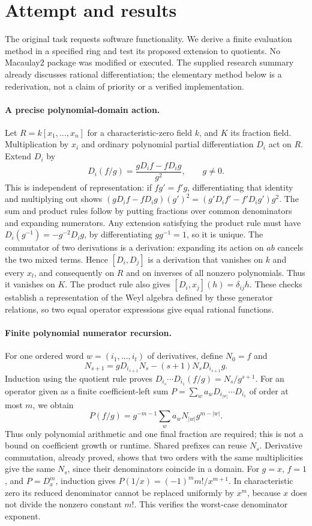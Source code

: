 \documentclass[11pt]{article}
\begin{document}
\section{Attempt and results}
The original task requests software functionality. We derive a finite evaluation
method in a specified ring and test its proposed extension to quotients. No
Macaulay2 package was modified or executed. The supplied research summary
already discusses rational differentiation; the elementary method below is a
rederivation, not a claim of priority or a verified implementation.

\paragraph{A precise polynomial-domain action.}
Let $R=k[x_1,\ldots,x_n]$ for a characteristic-zero field $k$, and $K$ its
fraction field. Multiplication by $x_i$ and ordinary polynomial partial
 differentiation $D_i$ act on $R$. Extend $D_i$ by
\[
D_i(f/g)=\frac{gD_if-fD_ig}{g^2},\qquad g\ne0.
\]
This is independent of representation: if $fg'=f'g$, differentiating that
identity and multiplying out shows
$(gD_if-fD_ig)(g')^2=(g'D_if'-f'D_ig')g^2$.
The sum and product rules follow by putting fractions over common denominators
and expanding numerators. Any extension satisfying the product rule must have
$D_i(g^{-1})=-g^{-2}D_ig$, by differentiating $gg^{-1}=1$, so it is unique.
The commutator of two derivations is a derivation: expanding its action on $ab$
cancels the two mixed terms. Hence $[D_i,D_j]$ is a derivation that vanishes on
$k$ and every $x_l$, and consequently on $R$ and on inverses of all nonzero
polynomials. Thus it vanishes on $K$. The product rule also gives
$[D_i,x_j](h)=\delta_{ij}h$. These checks establish a representation of the
Weyl algebra defined by these generator relations, so two equal operator
expressions give equal rational functions.

\paragraph{Finite polynomial numerator recursion.}
For one ordered word $w=(i_1,\ldots,i_t)$ of derivatives, define $N_0=f$ and
\[
N_{s+1}=gD_{i_{s+1}}N_s-(s+1)N_sD_{i_{s+1}}g.
\]
Induction using the quotient rule proves
$D_{i_s}\cdots D_{i_1}(f/g)=N_s/g^{s+1}$.
For an operator given as a finite coefficient-left sum
$P=\sum_w a_w D_{i_{|w|}}\cdots D_{i_1}$ of order at most $m$, we obtain
\[
P(f/g)=g^{-m-1}\sum_w a_w N_{|w|}g^{m-|w|}.
\]
Thus only polynomial arithmetic and one final fraction are required; this is
not a bound on coefficient growth or runtime. Shared prefixes can reuse $N_s$.
Derivative commutation, already proved, shows that two orders with the same
multiplicities give the same $N_s$, since their denominators coincide in a
domain. For $g=x$, $f=1$, and $P=D_x^m$, induction gives
$P(1/x)=(-1)^m m!/x^{m+1}$. In characteristic zero its reduced denominator
cannot be replaced uniformly by $x^m$, because $x$ does not divide the nonzero
constant $m!$. This verifies the worst-case denominator exponent.
\end{document}
